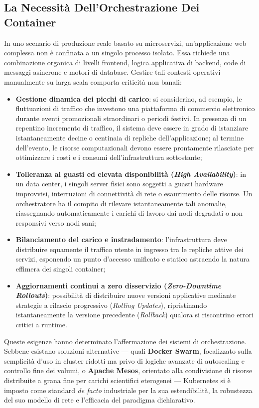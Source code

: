 \documentclass[11pt, a4paper]{article}
\begin{document}
\subsection{La Necessità Dell'Orchestrazione Dei Container}
In uno scenario di produzione reale basato su microservizi, un'applicazione web complessa non è confinata a un singolo processo isolato. Essa richiede una combinazione organica di livelli frontend, logica applicativa di backend, code di messaggi asincrone e motori di database. Gestire tali contesti operativi manualmente su larga scala comporta criticità non banali:
\begin{itemize}[noitemsep]
    \item \textbf{Gestione dinamica dei picchi di carico}: si considerino, ad esempio, le fluttuazioni di traffico che investono una piattaforma di commercio elettronico durante eventi promozionali straordinari o periodi festivi. In presenza di un repentino incremento di traffico, il sistema deve essere in grado di istanziare istantaneamente decine o centinaia di repliche dell'applicazione; al termine dell'evento, le risorse computazionali devono essere prontamente rilasciate per ottimizzare i costi e i consumi dell'infrastruttura sottostante;
    \item \textbf{Tolleranza ai guasti ed elevata disponibilità (\emph{High Availability})}: in un data center, i singoli server fisici sono soggetti a guasti hardware improvvisi, interruzioni di connettività di rete o esaurimento delle risorse. Un orchestratore ha il compito di rilevare istantaneamente tali anomalie, riassegnando automaticamente i carichi di lavoro dai nodi degradati o non responsivi verso nodi sani;
    \item \textbf{Bilanciamento del carico e instradamento}: l'infrastruttura deve distribuire equamente il traffico utente in ingresso tra le repliche attive dei servizi, esponendo un punto d'accesso unificato e statico astraendo la natura effimera dei singoli container;
    \item \textbf{Aggiornamenti continui a zero disservizio (\emph{Zero-Downtime Rollouts})}: possibilità di distribuire nuove versioni applicative mediante strategie a rilascio progressivo (\emph{Rolling Updates}), ripristinando istantaneamente la versione precedente (\emph{Rollback}) qualora si riscontrino errori critici a runtime.
\end{itemize}

Queste esigenze hanno determinato l'affermazione dei sistemi di orchestrazione. Sebbene esistano soluzioni alternative — quali \textbf{Docker Swarm}, focalizzato sulla semplicità d'uso in cluster ridotti ma privo di logiche avanzate di autoscaling e controllo fine dei volumi, o \textbf{Apache Mesos}, orientato alla condivisione di risorse distribuite a grana fine per carichi scientifici eterogenei — Kubernetes si è imposto come standard \emph{de facto} industriale per la sua estendibilità, la robustezza del suo modello di rete e l'efficacia del paradigma dichiarativo.
\end{document}
